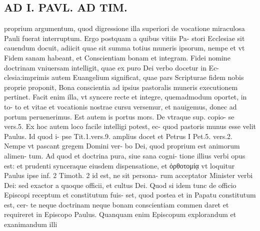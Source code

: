 \documentclass{article}
\begin{document}
\begin{pages}
\section*{AD I. PAVL. AD TIM. }
\marginpar{[ p.34 ]}\pstart proprium argumentum, quod digressione illa superiori de vocatione miraculosa Pauli fuerat interruptum. Ergo postquam a quibus vitiis Pa- stori Ecclesiae sit cauendum docuit, adiicit quae sit summa totius muneris ipsorum, nempe et vt Fidem sanam habeant, et Conscientiam bonam et integram. Fidei nomine doctrinam vniuersam intelligit, quae ex puro Dei verbo docetur in Ec- clesia:imprimis autem Euangelium significat, quae pars Scripturae fidem nobis proprie proponit, Bona conscientia ad ipsius pastoralis muneris executionem pertinet. Facit enim illa, vt syncere recte et integre, quemadmodum oportet, in to- to et vitae et vocationis nostrae cursu versemur, et nauigemus, donec ad portum peruenerimus. Est autem is portus mors. De vtraque sup. copio- se vers.5. Ex hoc autem loco facile intelligi potest, ec- quod pastoris munus esse velit Paulus. Id quod i- pse Tit.1.vers.9. amplius docet et Petrus I Pet.5. vers.2. Nempe vt pascant gregem Domini ver- bo Dei, quod proprium est animorum alimen- tum. Ad quod et doctrina pura, siue sana cogni- tione illius verbi opus est: et prudenti synceraque eiusdem dispensatione, et ὀρθοτομίᾳ vt loquitur Paulus ipse inf. 2 Timoth. 2 id est, ne sit persona- rum acceptator Minister verbi Dei: sed exactor a quoque officii, et cultus Dei. Quod si idem tunc de officio Episcopi receptum et constitutum fuis- set, quod postea et in Papatu constitutum est, cer- te neque doctrinam neque bonam conscientiam commen daret et requireret in Episcopo Paulus. Quanquam enim Episcopum explorandum et exanimandum illi  \pend

\end{pages}
\end{document}
